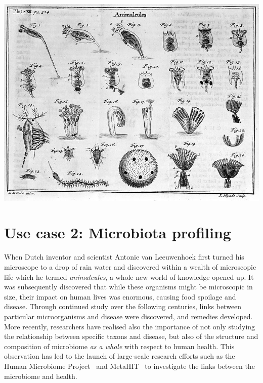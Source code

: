 \begin{justify}
\begin{center}
\begin{minipage}{5in}
\begin{center}
{\vspace*{1cm}
\includegraphics[scale=2]{chapters/images/mycrobiota/animalcules2.png}

}

\end{center}
\end{minipage}
\end{center}

\newpage


\section{Use case 2: Microbiota profiling}

When Dutch inventor and scientist Antonie van Leeuwenhoek first turned his microscope to a drop of rain water and discovered within a wealth of microscopic life which he termed \textit{animalcules}, a whole new world of knowledge opened up.
It was subsequently discovered that while these organisms might be microscopic in size, their impact on human lives was enormous, causing food spoilage and disease. Through continued study over the following centuries, links between particular microorganisms and disease were discovered, and remedies developed. More recently, researchers have realised also the importance of not only studying the relationship between specific taxons and disease, but also of the structure and composition of microbiome \emph{as a whole} with respect to human health. This observation has led to the launch of large-scale research efforts such as the Human Microbiome Project~\cite{turnbaugh2007human} and MetaHIT~\cite{ehrlich2011metahit} to investigate the links between the microbiome and health.



\end{justify}
